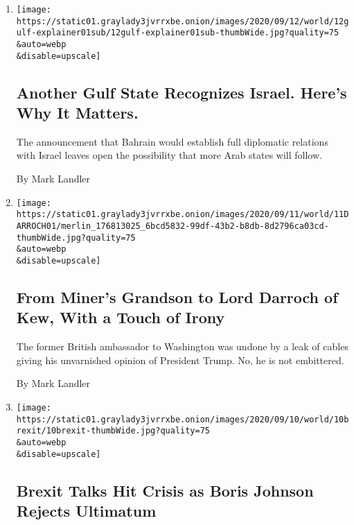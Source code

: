 \begin{enumerate}
\def\labelenumi{\arabic{enumi}.}
\item
  \href{/2020/09/12/world/middleeast/bahrain-israel.html}{}

  \texttt{[image: https://static01.graylady3jvrrxbe.onion/images/2020/09/12/world/12gulf-explainer01sub/12gulf-explainer01sub-thumbWide.jpg?quality=75\\\&auto=webp\\\&disable=upscale]}

  \hypertarget{another-gulf-state-recognizes-israel-heres-why-it-matters}{%
  \subsection{Another Gulf State Recognizes Israel. Here's Why It
  Matters.}\label{another-gulf-state-recognizes-israel-heres-why-it-matters}}

  The announcement that Bahrain would establish full diplomatic
  relations with Israel leaves open the possibility that more Arab
  states will follow.

  By Mark Landler
\item
  \href{/2020/09/11/world/europe/kim-darroch-washington-ambassador.html}{}

  \texttt{[image: https://static01.graylady3jvrrxbe.onion/images/2020/09/11/world/11DARROCH01/merlin\_176813025\_6bcd5832-99df-43b2-b8db-8d2796ca03cd-thumbWide.jpg?quality=75\\\&auto=webp\\\&disable=upscale]}

  \hypertarget{from-miners-grandson-to-lord-darroch-of-kew-with-a-touch-of-irony}{%
  \subsection{From Miner's Grandson to Lord Darroch of Kew, With a Touch
  of
  Irony}\label{from-miners-grandson-to-lord-darroch-of-kew-with-a-touch-of-irony}}

  The former British ambassador to Washington was undone by a leak of
  cables giving his unvarnished opinion of President Trump. No, he is
  not embittered.

  By Mark Landler
\item
  \href{/2020/09/10/world/europe/brexit-boris-johnson-ireland.html}{}

  \texttt{[image: https://static01.graylady3jvrrxbe.onion/images/2020/09/10/world/10brexit/10brexit-thumbWide.jpg?quality=75\\\&auto=webp\\\&disable=upscale]}

  \hypertarget{brexit-talks-hit-crisis-as-boris-johnson-rejects-ultimatum}{%
  \subsection{Brexit Talks Hit Crisis as Boris Johnson Rejects
  Ultimatum}\label{brexit-talks-hit-crisis-as-boris-johnson-rejects-ultimatum}}


\end{enumerate}
